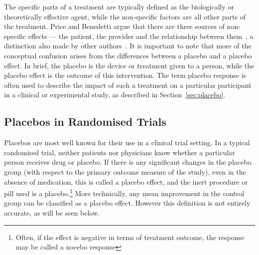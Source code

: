 The specific parts of a treatment are typically defined as the biologically or theoretically effective agent, while the non-specific factors are all other parts of the treatment. Price and Benedetti argue that there are three sources of non-specific effects --- the patient, the provider and the relationship between them~\cite{Price2008}, a distinction also made by other authors~\cite{Finniss2005,DiBlasi2002}. It is important to note that more of the conceptual confusion arises from the differences between a placebo and a placebo effect. In brief, the placebo is the device or treatment given to a person, while the placebo effect is the outcome of this intervention. The term placebo response is often used to describe the impact of such a treatment on a particular participant in a clinical or experimental study, as described in Section~\ref{sec:placebo}. 


\subsection{Placebos in Randomised Trials}
\label{sec:plac-rand-trials}

Placebos are most well known for their use in a clinical trial setting. %
In a typical randomised trial, neither patients nor physicians know whether a particular person receives drug or placebo.  If there is any significant changes in the placebo group (with respect to the primary outcome measure of the study), even in the absence of medication, this is called a placebo effect, and the inert procedure or pill used is a placebo.\footnote{Often, if the effect is negative in terms of treatment outcome, the response may be called a nocebo response} More technically, any mean improvement in the control group can be classified as a placebo effect. However this definition is not entirely accurate, as will be seen below.   


